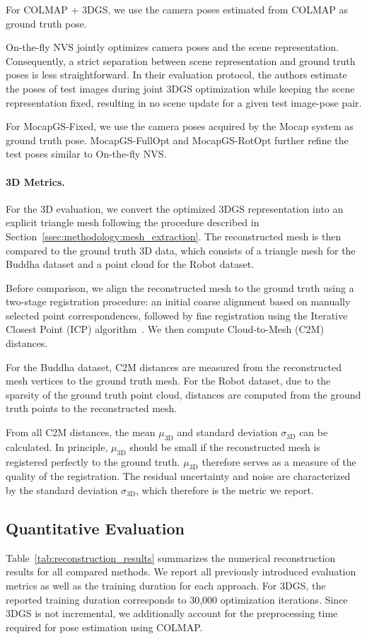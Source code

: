 \documentclass[a4paper,fleqn]{cas-dc}
\begin{document}
For COLMAP + 3DGS, we use the camera poses estimated from COLMAP as ground truth pose.

On-the-fly NVS jointly optimizes camera poses and the scene representation. Consequently, a strict separation between scene representation and ground truth poses is less straightforward. In their evaluation protocol, the authors estimate the poses of test images during joint 3DGS optimization while keeping the scene representation fixed, resulting in no scene update for a given test image-pose pair.

For MocapGS-Fixed, we use the camera poses acquired by the Mocap system as ground truth pose. MocapGS-FullOpt and MocapGS-RotOpt further refine the test poses similar to On-the-fly NVS.

\paragraph{3D Metrics.}
For the 3D evaluation, we convert the optimized 3DGS representation into an explicit triangle mesh following the procedure described in Section~\ref{ssec:methodology:mesh_extraction}. The reconstructed mesh is then compared to the ground truth 3D data, which consists of a triangle mesh for the Buddha dataset and a point cloud for the Robot dataset.

Before comparison, we align the reconstructed mesh to the ground truth using a two-stage registration procedure: an initial coarse alignment based on manually selected point correspondences, followed by fine registration using the Iterative Closest Point (ICP) algorithm~\cite{besl_method_1992}. We then compute Cloud-to-Mesh (C2M) distances.

For the Buddha dataset, C2M distances are measured from the reconstructed mesh vertices to the ground truth mesh. For the Robot dataset, due to the sparsity of the ground truth point cloud, distances are computed from the ground truth points to the reconstructed mesh.

From all C2M distances, the mean $\mu_{\mathrm{3D}}$ and standard deviation $\sigma_{\mathrm{3D}}$ can be calculated. In principle, $\mu_{\mathrm{3D}}$ should be small if the reconstructed mesh is registered perfectly to the ground truth. $\mu_{\mathrm{3D}}$ therefore serves as a measure of the quality of the registration. The residual uncertainty and noise are characterized by the standard deviation $\sigma_{\mathrm{3D}}$, which therefore is the metric we report.

\subsection{Quantitative Evaluation}
Table~\ref{tab:reconstruction_results} summarizes the numerical reconstruction results for all compared methods. We report all previously introduced evaluation metrics as well as the training duration for each approach. For 3DGS, the reported training duration corresponds to 30,000 optimization iterations. Since 3DGS is not incremental, we additionally account for the preprocessing time required for pose estimation using COLMAP.
\end{document}
